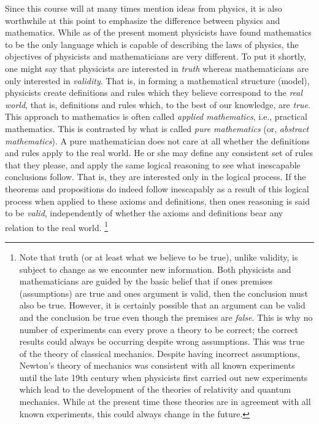 \documentclass[12pt,letterpaper,reqno]{article}
\numberwithin{equation}{section}
\newcommand{\ti}[1]{\textit{#1}}
\begin{document}
Since this course will at many times mention ideas from physics, it is also worthwhile at this point to emphasize the difference between physics and mathematics. While as of the present moment physicists have found mathematics to be the only language which is capable of describing the laws of physics, the objectives of physicists and mathematicians are very different. To put it shortly, one might say that physicists are interested in \ti{truth} whereas mathematicians are only interested in \ti{validity}. That is, in forming a mathematical structure (model), physicists create definitions and rules which they believe correspond to the \ti{real world}, that is, definitions and rules which, to the best of our knowledge, are \ti{true}. This approach to mathematics is often called \ti{applied mathematics}, i.e., practical mathematics. This is contrasted by what is called \ti{pure mathematics} (or, \ti{abstract mathematics}). A pure mathematician does not care at all whether the definitions and rules apply to the real world. He or she may define any consistent set of rules that they please, and apply the same logical reasoning to see what inescapable conclusions follow. That is, they are interested only in the logical process. If the theorems and propositions do indeed follow inescapably as a result of this logical process when applied to these axioms and definitions, then ones reasoning is said to be \ti{valid}, independently of whether the axioms and definitions bear any relation to the real world. \footnote{Note that truth (or at least what we believe to be true), unlike validity, is subject to change as we encounter new information. Both physicists and mathematicians are guided by the basic belief that if ones premises (assumptions) are true and ones argument is valid, then the conclusion must also be true. However, it is certainly possible that an argument can be valid and the conclusion be true even though the premises are \ti{false}. This is why no number of experiments can every prove a theory to be correct; the correct results could always be occurring despite wrong assumptions. This was true of the theory of classical mechanics. Despite having incorrect assumptions, Newton's theory of mechanics was consistent with all known experiments until the late 19th century when physicists first carried out new experiments which lead to the development of the theories of relativity and quantum mechanics. While at the present time these theories are in agreement with all known experiments, this could always change in the future.}
\end{document}
